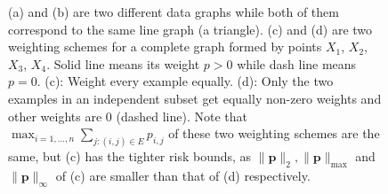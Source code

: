 \documentclass[letterpaper]{article} %
\def\SingleColumnEnd{}
\newcommand{\probdistri}{\mathbf{p}}
\newcommand{\pair}[1]{(#1)}
\begin{document}
\begin{figure}[h]
{    }\hspace{11ex}
    \hspace{5ex}
  \SingleColumnEnd
    \caption{(a) and (b) are two different data graphs while both of them correspond to the same line graph (a triangle). (c) and (d) are two weighting schemes for a complete graph formed by points $X_1$, $X_2$, $X_3$, $X_4$. Solid line means its weight $p>0$ while dash line means $p=0$. (c): Weight every example equally. (d): Only the two examples in an independent subset get equally non-zero weights and other weights are $0$ (dashed line). Note that $\max_{i=1,\dots,n} \sum_{j:\pair{i,j}\in E} p_{i,j}$ of these two weighting schemes are the same, but (c) has the tighter risk bounds, as $\|\probdistri{}\|_2, \|\probdistri{}\|_\max$ and $\|\probdistri{}\|_\infty$ of (c) are smaller than that of (d) respectively.}
    \label{fig:weighting_scheme_complete_graph}
\end{figure}

\end{document}
